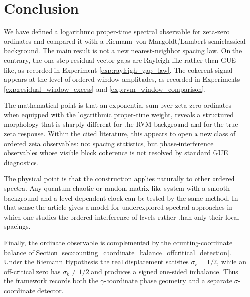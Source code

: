 \documentclass[11pt]{amsart}
\numberwithin{equation}{section}
\theoremstyle{plain}
\theoremstyle{definition}
\theoremstyle{remark}
\begin{document}
\section{Conclusion}
\label{sec:conclusion}

We have defined a logarithmic proper-time spectral observable for zeta-zero ordinates and compared it with a Riemann--von Mangoldt/Lambert semiclassical background.  The main result is not a new nearest-neighbor spacing law.  On the contrary, the one-step residual vector gaps are Rayleigh-like rather than GUE-like, as recorded in Experiment \ref{exp:rayleigh_gap_law}.  The coherent signal appears at the level of ordered window amplitudes, as recorded in Experiments \ref{exp:residual_window_excess} and \ref{exp:rvm_window_comparison}.

The mathematical point is that an exponential sum over zeta-zero ordinates, when equipped with the logarithmic proper-time weight, reveals a structured morphology that is sharply different for the RVM background and for the true zeta response.  Within the cited literature, this appears to open a new class of ordered zeta observables: not spacing statistics, but phase-interference observables whose visible block coherence is not resolved by standard GUE diagnostics.

The physical point is that the construction applies naturally to other ordered spectra.  Any quantum chaotic or random-matrix-like system with a smooth background and a level-dependent clock can be tested by the same method.  In that sense the article gives a model for underexplored spectral approaches in which one studies the ordered interference of levels rather than only their local spacings.

Finally, the ordinate observable is complemented by the counting-coordinate balance of Section \ref{sec:counting_coordinate_balance_offcritical_detection}.  Under the Riemann Hypothesis the real displacement satisfies \(\sigma_k=1/2\), while an off-critical zero has \(\sigma_k\neq1/2\) and produces a signed one-sided imbalance.  Thus the framework records both the \(\gamma\)-coordinate phase geometry and a separate \(\sigma\)-coordinate detector.
\end{document}
